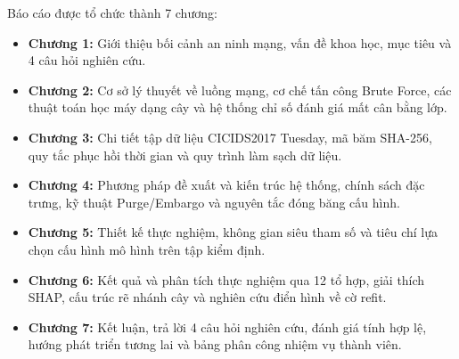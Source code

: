 Báo cáo được tổ chức thành 7 chương:
\begin{itemize}
    \item \textbf{Chương 1:} Giới thiệu bối cảnh an ninh mạng, vấn đề khoa học, mục tiêu và 4 câu hỏi nghiên cứu.
    \item \textbf{Chương 2:} Cơ sở lý thuyết về luồng mạng, cơ chế tấn công Brute Force, các thuật toán học máy dạng cây và hệ thống chỉ số đánh giá mất cân bằng lớp.
    \item \textbf{Chương 3:} Chi tiết tập dữ liệu CICIDS2017 Tuesday, mã băm SHA-256, quy tắc phục hồi thời gian và quy trình làm sạch dữ liệu.
    \item \textbf{Chương 4:} Phương pháp đề xuất và kiến trúc hệ thống, chính sách đặc trưng, kỹ thuật Purge/Embargo và nguyên tắc đóng băng cấu hình.
    \item \textbf{Chương 5:} Thiết kế thực nghiệm, không gian siêu tham số và tiêu chí lựa chọn cấu hình mô hình trên tập kiểm định.
    \item \textbf{Chương 6:} Kết quả và phân tích thực nghiệm qua 12 tổ hợp, giải thích SHAP, cấu trúc rẽ nhánh cây và nghiên cứu điển hình về cờ refit.
    \item \textbf{Chương 7:} Kết luận, trả lời 4 câu hỏi nghiên cứu, đánh giá tính hợp lệ, hướng phát triển tương lai và bảng phân công nhiệm vụ thành viên.
\end{itemize}
